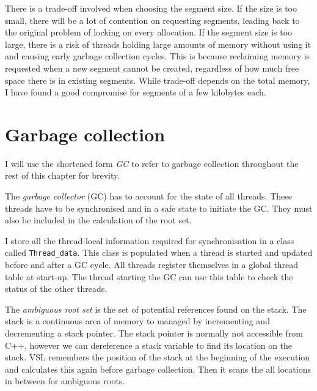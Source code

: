There is a trade-off involved when choosing the segment size. If the size is too small,
there will be a lot of contention on requesting segments, leading back to the original
problem of locking on every allocation. If the segment size is too large, there is a risk
of threads holding large amounts of memory without using it and causing early garbage collection
cycles. This is because reclaiming memory is requested when a new segment cannot be created,
regardless of how much free space there is in existing segments. While trade-off depends on the
total memory, I have found a good compromise for segments of a few kilobytes each.

\section{Garbage collection}
\label{sec:gc}
I will use the shortened form \emph{GC} to refer to garbage collection throughout the rest of this chapter for
brevity.

The \emph{garbage collector} (GC) has to account for the state of all threads. These threads have to be synchronised
and in a safe state to initiate the GC. They must also be included in the calculation of the root set.

I store all the thread-local information required for synchronisation in a class called \texttt{Thread\_data}. This
class is populated when a thread is started and updated before and after a GC cycle. All threads register
themselves in a global thread table at start-up. The thread starting the GC can use this table to check the status
of the other threads.

The \emph{ambiguous root set} is the set of potential references found on the stack. The stack is a continuous area
of memory to managed by incrementing and decrementing a stack pointer. The stack pointer is normally not accessible
from C++, however we can dereference a stack variable to find its location on the stack. VSL remembers the position
of the stack at the beginning of the execution and calculates this again before garbage collection. Then it
scans the all locations in between for ambiguous roots.

